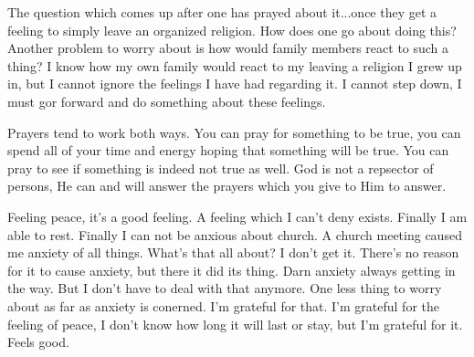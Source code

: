The question which comes up after one has prayed about it...once they get a feeling
to simply leave an organized religion. How does one go about doing this? Another
problem to worry about is how would family members react to such a thing? I know how
my own family would react to my leaving a religion I grew up in, but I cannot ignore
the feelings I have had regarding it. I cannot step down, I must gor forward and do
something about these feelings.

Prayers tend to work both ways. You can pray for something to be true, you can spend
all of your time and energy hoping that something will be true. You can pray to see
if something is indeed not true as well. God is not a repsector of persons, He can
and will answer the prayers which you give to Him to answer.

Feeling peace, it's a good feeling. A feeling which I can't deny exists. Finally I am
able to rest. Finally I can not be anxious about church. A church meeting caused me
anxiety of all things. What's that all about? I don't get it. There's no reason for
it to cause anxiety, but there it did its thing. Darn anxiety always getting in the
way. But I don't have to deal with that anymore. One less thing to worry about as far
as anxiety is conerned. I'm grateful for that. I'm grateful for the feeling of peace,
I don't know how long it will last or stay, but I'm grateful for it. Feels good.
